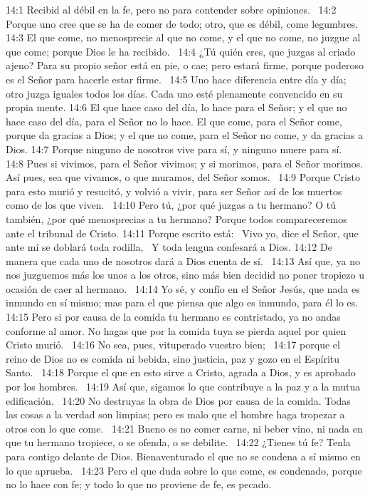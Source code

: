 14:1 Recibid al débil en la fe, pero no para contender sobre opiniones.  
14:2 Porque uno cree que se ha de comer de todo; otro, que es débil, come legumbres.  
14:3 El que come, no menosprecie al que no come, y el que no come, no juzgue al que come; porque Dios le ha recibido.  
14:4 ¿Tú quién eres, que juzgas al criado ajeno? Para su propio señor está en pie, o cae; pero estará firme, porque poderoso es el Señor para hacerle estar firme.  
14:5 Uno hace diferencia entre día y día; otro juzga iguales todos los días. Cada uno esté plenamente convencido en su propia mente. 
14:6 El que hace caso del día, lo hace para el Señor; y el que no hace caso del día, para el Señor no lo hace. El que come, para el Señor come, porque da gracias a Dios; y el que no come, para el Señor no come, y da gracias a Dios. 
14:7 Porque ninguno de nosotros vive para sí, y ninguno muere para sí.  
14:8 Pues si vivimos, para el Señor vivimos; y si morimos, para el Señor morimos. Así pues, sea que vivamos, o que muramos, del Señor somos.  
14:9 Porque Cristo para esto murió y resucitó, y volvió a vivir, para ser Señor así de los muertos como de los que viven.  
14:10 Pero tú, ¿por qué juzgas a tu hermano? O tú también, ¿por qué menosprecias a tu hermano? Porque todos compareceremos ante el tribunal de Cristo. 
14:11 Porque escrito está:  
Vivo yo, dice el Señor, que ante mí se doblará toda rodilla,  
Y toda lengua confesará a Dios. 
14:12 De manera que cada uno de nosotros dará a Dios cuenta de sí.  
14:13 Así que, ya no nos juzguemos más los unos a los otros, sino más bien decidid no poner tropiezo u ocasión de caer al hermano.  
14:14 Yo sé, y confío en el Señor Jesús, que nada es inmundo en sí mismo; mas para el que piensa que algo es inmundo, para él lo es.  
14:15 Pero si por causa de la comida tu hermano es contristado, ya no andas conforme al amor. No hagas que por la comida tuya se pierda aquel por quien Cristo murió.  
14:16 No sea, pues, vituperado vuestro bien;  
14:17 porque el reino de Dios no es comida ni bebida, sino justicia, paz y gozo en el Espíritu Santo.  
14:18 Porque el que en esto sirve a Cristo, agrada a Dios, y es aprobado por los hombres.  
14:19 Así que, sigamos lo que contribuye a la paz y a la mutua edificación.  
14:20 No destruyas la obra de Dios por causa de la comida. Todas las cosas a la verdad son limpias; pero es malo que el hombre haga tropezar a otros con lo que come.  
14:21 Bueno es no comer carne, ni beber vino, ni nada en que tu hermano tropiece, o se ofenda, o se debilite.  
14:22 ¿Tienes tú fe? Tenla para contigo delante de Dios. Bienaventurado el que no se condena a sí mismo en lo que aprueba.  
14:23 Pero el que duda sobre lo que come, es condenado, porque no lo hace con fe; y todo lo que no proviene de fe, es pecado. 
